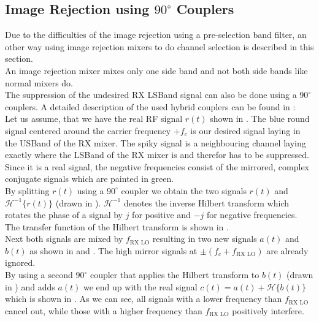 \subsection{Image Rejection using $90^\circ$ Couplers}
\label{sec:rx_rf_1}
Due to the difficulties of the image rejection using a pre-selection
band filter, an other way using image rejection mixers to do channel selection
is described in this section. \\

An image rejection mixer mixes only one side band and not both side bands
like normal mixers do. \\

The suppression of the undesired \gls{RX} \gls{LSBand} signal can also be done
using a $90^\circ$ couplers.
A detailed description of the used hybrid couplers can be found in
: \\

Let us assume, that we have the real \gls{RF} signal $r(t)$ shown in
.
The blue round signal centered around the carrier frequency $+f_c$ is our
desired signal laying in the \gls{USBand} of the \gls{RX} mixer.
The spiky signal is a neighbouring channel laying exactly
where the \gls{LSBand} of the \gls{RX} mixer is and therefor has to
be suppressed.
Since it is a real signal, the negative frequencies consist of the mirrored,
complex conjugate signals which are painted in green. \\

By splitting $r(t)$ using a $90^\circ$ coupler we obtain the two signals
$r(t)$ and $\mathcal{H}^{-1}\{r(t)\}$ (drawn in ).
$\mathcal{H}^{-1}$ denotes the inverse Hilbert transform which rotates the phase
of a signal by $j$ for positive and $-j$ for negative frequencies.
The transfer function of the Hilbert transform is shown in
. \\

Next both signals are mixed by $f_{\text{RX LO}}$ resulting in two new signals
$a(t)$ and $b(t)$ as shown in  and
.
The high mirror signals at $\pm (f_c + f_{\text{RX LO}})$ are already
ignored. \\

By using a second $90^\circ$ coupler that applies the Hilbert transform
to $b(t)$ (drawn in )
and adds $a(t)$ we end up with the real signal
$c(t) = a(t) + \mathcal{H}\{b(t)\}$
which is shown in .
As we can see, all signals with a lower frequency than $f_{\text{RX LO}}$
cancel out, while those with a higher frequency than $f_{\text{RX LO}}$
positively interfere. \\

